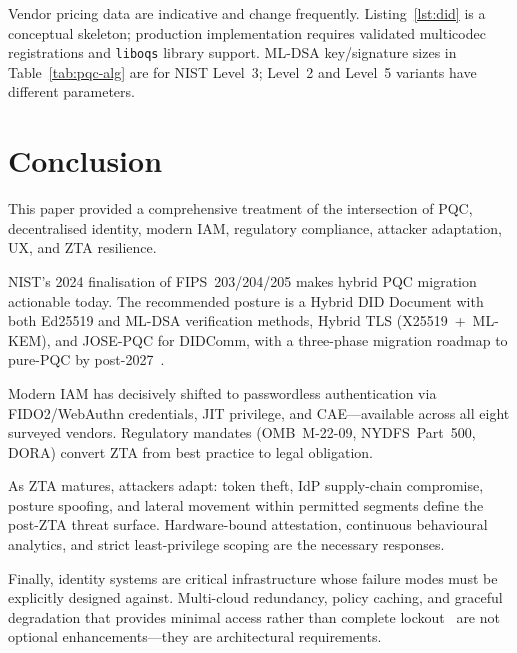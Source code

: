 \documentclass[sigconf,nonacm]{acmart}
\begin{document}
Vendor pricing data are indicative and change frequently.
Listing~\ref{lst:did} is a conceptual skeleton; production
implementation requires validated multicodec registrations and
\texttt{liboqs} library support.  ML-DSA key/signature sizes in
Table~\ref{tab:pqc-alg} are for NIST Level~3; Level~2 and Level~5
variants have different parameters.

\section{Conclusion}

This paper provided a comprehensive treatment of the intersection of PQC,
decentralised identity, modern IAM, regulatory compliance, attacker
adaptation, UX, and ZTA resilience.

NIST's 2024 finalisation of FIPS~203/204/205 makes hybrid PQC migration
actionable today.  The recommended posture is a Hybrid DID Document with
both Ed25519 and ML-DSA verification methods, Hybrid TLS
(X25519~+~ML-KEM), and JOSE-PQC for DIDComm, with a three-phase
migration roadmap to pure-PQC by post-2027~\cite{nist204,linkedin2024}.

Modern IAM has decisively shifted to passwordless authentication via
FIDO2/WebAuthn credentials, JIT privilege, and CAE---available across
all eight surveyed vendors.  Regulatory mandates (OMB~M-22-09,
NYDFS~Part~500, DORA) convert ZTA from best practice to legal
obligation.

As ZTA matures, attackers adapt: token theft, IdP supply-chain
compromise, posture spoofing, and lateral movement within permitted
segments define the post-ZTA threat surface.  Hardware-bound attestation,
continuous behavioural analytics, and strict least-privilege scoping are
the necessary responses.

Finally, identity systems are critical infrastructure whose failure modes
must be explicitly designed against.  Multi-cloud redundancy, policy
caching, and graceful degradation that provides minimal access rather than
complete lockout~\cite{hackernews2024} are not optional
enhancements---they are architectural requirements.
\end{document}
